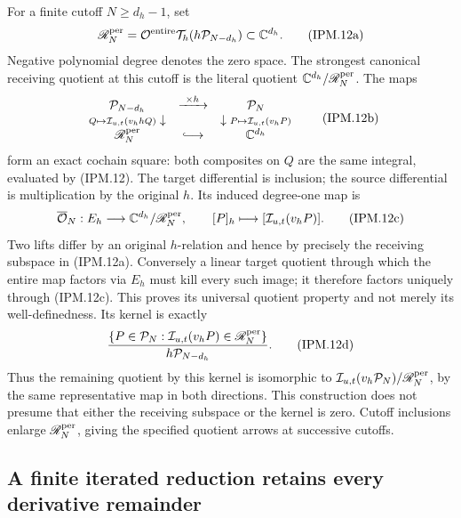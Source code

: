 \documentclass[11pt,a4paper]{article}
\theoremstyle{definition}
\begin{document}
For a finite cutoff \(N\ge d_h-1\), set
\[
 \mathscr R_N^{\rm per}
    =\mathcal O^{\rm entire}\mathcal T_h
                    (h\mathcal P_{N-d_h})\subset\mathbb C^{d_h}.
 \tag{IPM.12a}
\]
Negative polynomial degree denotes the zero space. The strongest
canonical receiving quotient at this cutoff is the literal quotient
\(\mathbb C^{d_h}/\mathscr R_N^{\rm per}\). The maps
\[
 \begin{array}{ccc}
 \mathcal P_{N-d_h}&\xrightarrow{\ \times h\ }&\mathcal P_N\\
 {\scriptstyle Q\mapsto\mathcal I_{u,t}(v_hhQ)}\downarrow&&
       \downarrow{\scriptstyle P\mapsto\mathcal I_{u,t}(v_hP)}\\
 \mathscr R_N^{\rm per}&\lhook\joinrel\longrightarrow&\mathbb C^{d_h}
 \end{array}
 \tag{IPM.12b}
\]
form an exact cochain square: both composites on \(Q\) are the same
integral, evaluated by (IPM.12). The target differential is inclusion;
the source differential is multiplication by the original \(h\).
Its induced degree-one map is
\[
 \overline{\mathcal O}_N:E_h\longrightarrow
             \mathbb C^{d_h}/\mathscr R_N^{\rm per},\qquad
 [P]_h\longmapsto[\mathcal I_{u,t}(v_hP)].
 \tag{IPM.12c}
\]
Two lifts differ by an original \(h\)-relation and hence by precisely
the receiving subspace in (IPM.12a). Conversely a linear target quotient
through which the entire map factors via \(E_h\) must kill every such
image; it therefore factors uniquely through (IPM.12c). This proves
its universal quotient property and not merely its well-definedness.
Its kernel is exactly
\[
 \frac{\{P\in\mathcal P_N:
              \mathcal I_{u,t}(v_hP)\in\mathscr R_N^{\rm per}\}}
       {h\mathcal P_{N-d_h}}.
 \tag{IPM.12d}
\]
Thus the remaining quotient by this kernel is isomorphic to
\(\mathcal I_{u,t}(v_h\mathcal P_N)/\mathscr R_N^{\rm per}\), by
the same representative map in both directions. This construction
does not presume that either the receiving subspace or the kernel is
zero. Cutoff inclusions enlarge \(\mathscr R_N^{\rm per}\), giving
the specified quotient arrows at successive cutoffs.

\subsection{A finite iterated reduction retains every derivative remainder}
\end{document}
